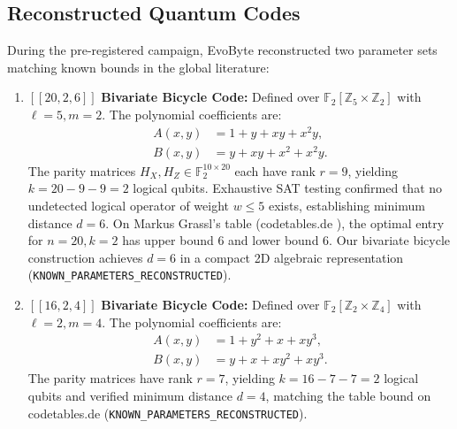 \documentclass[11pt,a4paper]{article}
\begin{document}
\subsection{Reconstructed Quantum Codes}
\label{sec:qecc_reconstructions}
During the pre-registered campaign, EvoByte reconstructed two parameter sets matching known bounds in the global literature:
\begin{enumerate}
    \item $[[20, 2, 6]]$ \textbf{Bivariate Bicycle Code:} Defined over $\mathbb{F}_2[\mathbb{Z}_5 \times \mathbb{Z}_2]$ with $\ell=5, m=2$. The polynomial coefficients are:
    \begin{align}
    A(x, y) &= 1 + y + x y + x^2 y, \\
    B(x, y) &= y + x y + x^2 + x^2 y.
    \end{align}
    The parity matrices $H_X, H_Z \in \mathbb{F}_2^{10 \times 20}$ each have rank $r=9$, yielding $k = 20 - 9 - 9 = 2$ logical qubits. Exhaustive SAT testing confirmed that no undetected logical operator of weight $w \le 5$ exists, establishing minimum distance $d=6$. On Markus Grassl's table (codetables.de \cite{grassl2026codetables}), the optimal entry for $n=20, k=2$ has upper bound 6 and lower bound 6. Our bivariate bicycle construction achieves $d=6$ in a compact 2D algebraic representation (\texttt{KNOWN\_PARAMETERS\_RECONSTRUCTED}).
    \item $[[16, 2, 4]]$ \textbf{Bivariate Bicycle Code:} Defined over $\mathbb{F}_2[\mathbb{Z}_2 \times \mathbb{Z}_4]$ with $\ell=2, m=4$. The polynomial coefficients are:
    \begin{align}
    A(x, y) &= 1 + y^2 + x + x y^3, \\
    B(x, y) &= y + x + x y^2 + x y^3.
    \end{align}
    The parity matrices have rank $r=7$, yielding $k = 16 - 7 - 7 = 2$ logical qubits and verified minimum distance $d=4$, matching the table bound on codetables.de (\texttt{KNOWN\_PARAMETERS\_RECONSTRUCTED}).
\end{enumerate}
\end{document}

